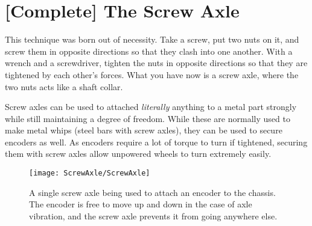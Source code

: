 ﻿\section{[Complete] The Screw Axle}

This technique was born out of necessity. Take a screw, put two nuts on it, and screw them in opposite directions so that they clash into one another. With a wrench and a screwdriver, tighten the nuts in opposite directions so that they are tightened by each other's forces. What you have now is a screw axle, where the two nuts acts like a shaft collar.

Screw axles can be used to attached \textit{literally} anything to a metal part strongly while still maintaining a degree of freedom. While these are normally used to make metal whips (steel bars with screw axles), they can be used to secure encoders as well. As encoders require a lot of torque to turn if tightened, securing them with screw axles allow unpowered wheels to turn extremely easily.

\begin{figure}[h]
    \centering
    \texttt{[image: ScrewAxle/ScrewAxle]}
    \caption{
        A single screw axle being used to attach an encoder to the chassis. The encoder is free to move up and down in the case of axle vibration, and the screw axle prevents it from going anywhere else.
    }
\end{figure}
